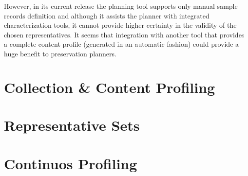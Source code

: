 However, in its current release the planning tool supports only manual sample records definition and although it assists the planner with integrated characterization tools, it cannot provide higher certainty in the validity of the chosen representatives. It seems that integration with another tool that provides a complete content profile (generated in an automatic fashion) could provide a huge benefit to preservation planners.

\section{Collection \& Content Profiling}

\section{Representative Sets}

\section{Continuos Profiling}